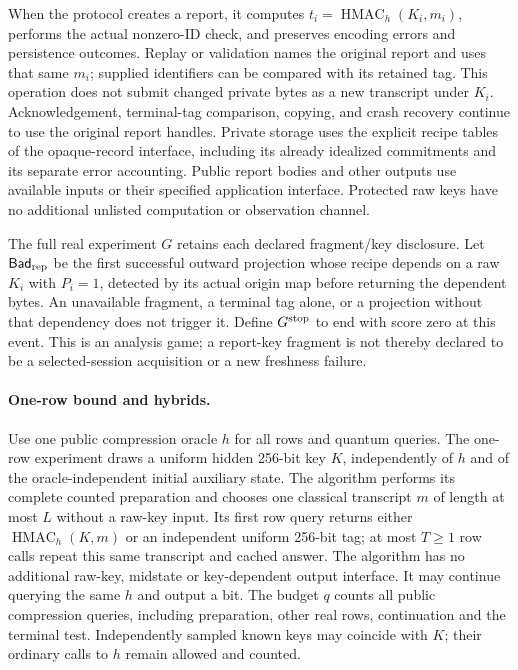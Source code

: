 When the protocol creates a report, it computes
$t_i=\operatorname{HMAC}_h(K_i,m_i)$, performs the actual nonzero-ID check,
and preserves encoding errors and persistence outcomes. Replay or validation names the
original report and uses that same $m_i$; supplied identifiers can be compared
with its retained tag.  This operation does not submit changed private bytes
as a new transcript under $K_i$.  Acknowledgement, terminal-tag comparison,
copying, and crash recovery continue to use the original report handles.
Private storage uses the explicit recipe tables of the opaque-record
interface, including its already idealized commitments and its separate error
accounting.  Public report bodies and other outputs use available inputs or
their specified application interface.  Protected raw keys have no additional
unlisted computation or observation channel.

The full real experiment $G$ retains each declared fragment/key disclosure.
Let $\mathsf{Bad}_{\rm rep}$ be the first successful outward projection whose
recipe depends on a raw $K_i$ with $P_i=1$, detected by its actual origin map
before returning the dependent bytes.  An unavailable fragment, a terminal
tag alone, or a projection without that dependency does not trigger it.
Define $G^{\rm stop}$ to end with score zero at this event.  This is an
analysis game; a report-key fragment is not thereby declared to be a
selected-session acquisition or a new freshness failure.

\paragraph{One-row bound and hybrids.}
Use one public compression oracle $h$ for all rows and quantum queries.
The one-row experiment draws a uniform hidden 256-bit key $K$, independently
of $h$ and of the oracle-independent initial auxiliary state. The algorithm performs
its complete counted preparation and chooses one classical transcript $m$ of
length at most $L$ without a raw-key input. Its first row query returns either
$\operatorname{HMAC}_h(K,m)$ or an independent uniform 256-bit tag; at most
$T\ge1$ row calls repeat this same transcript and cached answer. The algorithm
has no additional raw-key, midstate or key-dependent output interface.
It may continue querying the same $h$ and output a bit. The budget $q$ counts
all public compression queries, including preparation, other real rows,
continuation and the terminal test. Independently sampled known keys may
coincide with $K$; their ordinary calls to $h$ remain allowed and counted.

